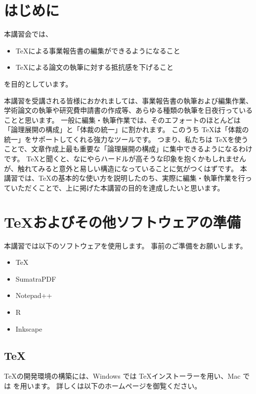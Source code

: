 \section{はじめに}

本講習会では、
\begin{itemize}
\item \TeX による事業報告書の編集ができるようになること
\item \TeX による論文の執筆に対する抵抗感を下げること
\end{itemize}
を目的としています。

本講習を受講される皆様におかれましては、事業報告書の執筆および編集作業、学術論文の執筆や研究費申請書の作成等、あらゆる種類の執筆を日夜行っていることと思います。
一般に編集・執筆作業では、そのエフォートのほとんどは「論理展開の構成」と「体裁の統一」に割かれます。
このうち \TeX は「体裁の統一」をサポートしてくれる強力なツールです。
つまり、私たちは \TeX を使うことで、文章作成上最も重要な「論理展開の構成」に集中できるようになるわけです。
\TeX と聞くと、なにやらハードルが高そうな印象を抱くかもしれませんが、触れてみると意外と易しい構造になっていることに気がつくはずです。
本講習では、\TeX の基本的な使い方を説明したのち、実際に編集・執筆作業を行っていただくことで、上に掲げた本講習の目的を達成したいと思います。





\section*{\TeX およびその他ソフトウェアの準備}
本講習では以下のソフトウェアを使用します。
事前のご準備をお願いします。
\begin{itemize}
\item TeX
\item SumatraPDF
\item Notepad++
\item R
\item Inkscape
\end{itemize}

\subsection*{TeX}
\TeX の開発環境の構築には、Windows では \TeX インストーラーを用い、Mac では  を用います。
詳しくは以下のホームページを御覧ください。


